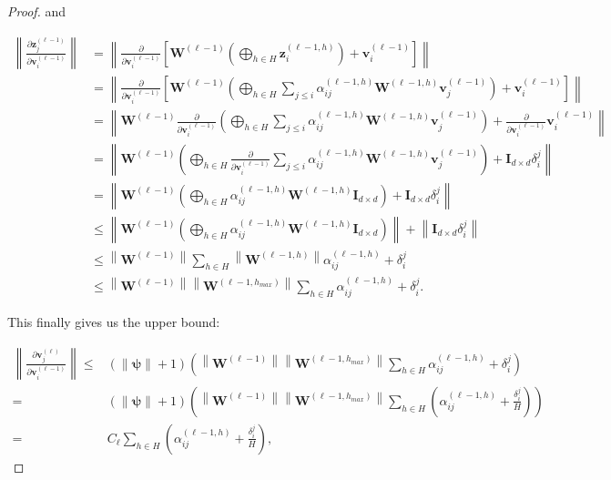 \documentclass{article} %
\newcommand{\vb}{\mathbf{v}}
\newcommand{\zb}{\mathbf{z}}
\newcommand{\psib}{\boldsymbol{\psi}}
\newcommand{\Wb}{\mathbf{W}}
\newcommand{\Ib}{\mathbf{I}}
\begin{document}
\begin{proof}
and 

\begin{align*}
    \left \lVert \frac{\partial \zb_j^{(\ell - 1)}}{\partial \vb_i^{(\ell- 1)}} \right \rVert &= \left \lVert \frac{\partial }{\partial \vb_i^{(\ell- 1)}}\left[ \Wb^{(\ell-1)}\left(\bigoplus_{h \in H} \zb_i^{(\ell-1 , h)}\right) + \vb^{(\ell-1)}_i \right] \right \rVert \\
    &= \left \lVert \frac{\partial }{\partial \vb_i^{(\ell- 1)}}\left[ \Wb^{(\ell-1)}\left(\bigoplus_{h \in H} \sum_{j \leq i} \alpha_{ij}^{(\ell-1, h)} \Wb^{(\ell-1, h)} \vb^{(\ell-1)}_j\right) + \vb^{(\ell-1)}_i \right] \right \rVert \\
    &= \left \lVert \Wb^{(\ell-1)} \frac{\partial }{\partial \vb_i^{(\ell- 1)}} \left(\bigoplus_{h \in H} \sum_{j \leq i} \alpha_{ij}^{(\ell-1, h)} \Wb^{(\ell-1, h)} \vb^{(\ell-1)}_j\right) +  \frac{\partial }{\partial \vb_i^{(\ell- 1)}} \vb^{(\ell-1)}_i \right \rVert \\
    &= \left \lVert \Wb^{(\ell-1)}  \left(\bigoplus_{h \in H} \frac{\partial }{\partial \vb_i^{(\ell- 1)}} \sum_{j \leq i} \alpha_{ij}^{(\ell-1, h)} \Wb^{(\ell-1, h)} \vb^{(\ell-1)}_j\right) +  \Ib_{d \times d} \delta_i^j \right \rVert \\
    &= \left \lVert \Wb^{(\ell-1)}  \left(\bigoplus_{h \in H} \alpha_{ij}^{(\ell-1, h)} \Wb^{(\ell-1, h)} \Ib_{d \times d} \right) +  \Ib_{d \times d} \delta_i^j \right \rVert \\
    &\leq \left \lVert \Wb^{(\ell-1)}  \left(\bigoplus_{h \in H} \alpha_{ij}^{(\ell-1, h)} \Wb^{(\ell-1, h)} \Ib_{d \times d} \right) \right \rVert + \left \lVert  \Ib_{d \times d} \delta_i^j \right \rVert \\
    &\leq \left \lVert \Wb^{(\ell -1)} \right \rVert \sum_{h \in H} \left \lVert \Wb^{(\ell -1, h)} \right \rVert\alpha_{ij}^{(\ell -1 ,h)} + \delta_i^j  \\
    &\leq \left \lVert \Wb^{(\ell -1)} \right \rVert \left \lVert \Wb^{(\ell -1, h_{max})} \right \rVert \sum_{h \in H} \alpha_{ij}^{(\ell -1 ,h)} + \delta_i^j.
\end{align*}

This finally gives us the upper bound:

\begin{align*}
    \left \lVert \frac{\partial \vb_j^{(\ell)}}{\partial \vb_i^{(\ell -1)}} \right \rVert \leq& \left( \left \lVert \psib \right \rVert + 1\right)\left(\left \lVert \Wb^{(\ell -1)} \right \rVert \left \lVert \Wb^{(\ell -1, h_{max})} \right \rVert \sum_{h \in H} \alpha_{ij}^{(\ell -1 ,h)} + \delta_i^j\right) \\
    =& \left( \left \lVert \psib \right \rVert + 1\right)\left(\left \lVert \Wb^{(\ell -1)} \right \rVert \left \lVert \Wb^{(\ell -1, h_{max})} \right \rVert \sum_{h \in H} \left(\alpha_{ij}^{(\ell -1 ,h)} + \frac{\delta_i^j}{H}\right)\right) \\
    =& C_\ell \sum_{h \in H} \left(\alpha_{ij}^{(\ell -1 ,h)} + \frac{\delta_i^j}{H} \right),
\end{align*}


\end{proof}
\end{document}
